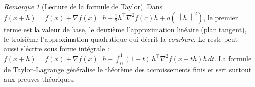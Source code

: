 \documentclass[a4paper,11pt]{report}
\theoremstyle{plain}
\theoremstyle{definition}
\newtheorem{exemple}[theorem]{Exemple}
\theoremstyle{remark}
\newtheorem{remarque}[theorem]{Remarque}
\newcommand{\norm}[1]{\left\lVert#1\right\rVert}
\newcommand{\grad}{\nabla}
\newcommand{\hess}{\nabla^2}
\newcommand{\T}{^{\!\top}}
\begin{document}
			
			\begin{remarque}[Lecture de la formule de Taylor]
				Dans $f(x+h)=f(x)+\grad f(x)\T h+\frac12h\T\hess f(x)h+o(\norm h^2)$, le premier terme est la valeur de base, le deuxième l'approximation linéaire (plan tangent), le troisième l'approximation quadratique qui décrit la \emph{courbure}. Le reste peut aussi s'écrire sous forme intégrale : $f(x+h)=f(x)+\grad f(x)\T h+\int_0^1(1-t)\,h\T\hess f(x+th)h\,dt$. La formule de Taylor--Lagrange généralise le théorème des accroissements finis et sert surtout aux preuves théoriques.
			\end{remarque}
			
\end{document}
